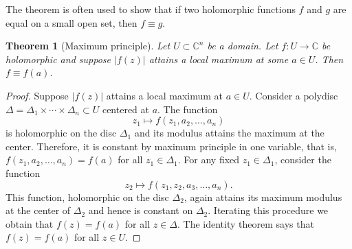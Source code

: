 \documentclass[12pt,openany]{book}
\newcommand{\sabs}[1]{\lvert {#1} \rvert}
\newcommand{\C}{{\mathbb{C}}}
\theoremstyle{plain}
\newtheorem{thm}{Theorem}[section]
\theoremstyle{remark}
\theoremstyle{definition}
\theoremstyle{exercise}
\theoremstyle{example}
\begin{document}
The theorem is often used to show that 
if two holomorphic functions $f$ and $g$ 
are equal on a small open set,
then $f \equiv g$.

\begin{thm}[Maximum principle]
Let $U \subset \C^n$ be a domain.
Let $f \colon U \to \C$ be holomorphic and suppose $\sabs{f(z)}$
attains a local maximum at some $a \in U$.  Then $f \equiv f(a)$.
\end{thm}

\begin{proof}
Suppose $\sabs{f(z)}$ attains a local maximum at $a \in U$.  Consider a polydisc
$\Delta = \Delta_1 \times \cdots \times \Delta_n \subset U$
centered at $a$.  The function
\begin{equation*}
z_1 \mapsto f(z_1,a_2,\ldots,a_n) 
\end{equation*}
is holomorphic
on the disc $\Delta_1$ and its modulus attains the maximum
at the center.  Therefore, it is constant by maximum principle in one variable,
that is, $f(z_1,a_2,\ldots,a_n)  = f(a)$ for all $z_1 \in \Delta_1$.  For
any fixed $z_1
\in \Delta_1$, consider the function
\begin{equation*}
z_2 \mapsto f(z_1,z_2,a_3,\ldots,a_n)  .
\end{equation*}
This function, holomorphic on the disc $\Delta_2$, again attains its maximum modulus at the center of $\Delta_2$
and hence is constant on $\Delta_2$.  Iterating this procedure we obtain
that $f(z) = f(a)$ for all $z \in \Delta$.  The identity theorem says
that $f(z) = f(a)$ for all $z \in U$.
\end{proof}
\end{document}
